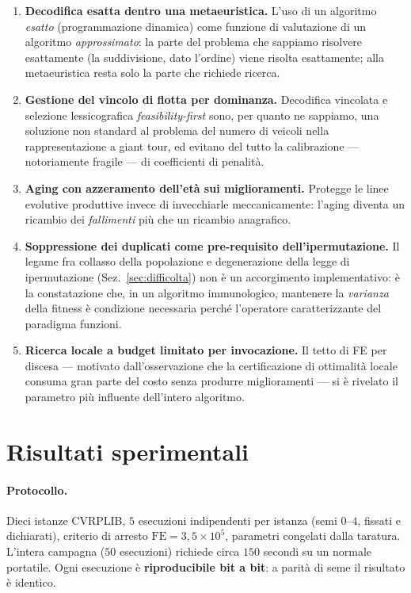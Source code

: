 \documentclass[10pt,a4paper]{article}
\begin{document}
\begin{enumerate}\itemsep1pt
  \item \textbf{Decodifica esatta dentro una metaeuristica.} L'uso di un algoritmo
  \emph{esatto} (programmazione dinamica) come funzione di valutazione di un
  algoritmo \emph{approssimato}: la parte del problema che sappiamo risolvere
  esattamente (la suddivisione, dato l'ordine) viene risolta esattamente; alla
  metaeuristica resta solo la parte che richiede ricerca.

  \item \textbf{Gestione del vincolo di flotta per dominanza.} Decodifica vincolata
  e selezione lessicografica \emph{feasibility-first} sono, per quanto ne sappiamo,
  una soluzione non standard al problema del numero di veicoli nella
  rappresentazione a giant tour, ed evitano del tutto la calibrazione --- notoriamente
  fragile --- di coefficienti di penalità.

  \item \textbf{Aging con azzeramento dell'età sui miglioramenti.} Protegge le linee
  evolutive produttive invece di invecchiarle meccanicamente: l'aging diventa un
  ricambio dei \emph{fallimenti} più che un ricambio anagrafico.

  \item \textbf{Soppressione dei duplicati come pre-requisito dell'ipermutazione.}
  Il legame fra collasso della popolazione e degenerazione della legge di
  ipermutazione (Sez.~\ref{sec:difficolta}) non è un accorgimento implementativo:
  è la constatazione che, in un algoritmo immunologico, mantenere la \emph{varianza}
  della fitness è condizione necessaria perché l'operatore caratterizzante del
  paradigma funzioni.

  \item \textbf{Ricerca locale a budget limitato per invocazione.} Il tetto di FE
  per discesa --- motivato dall'osservazione che la certificazione di ottimalità
  locale consuma gran parte del costo senza produrre miglioramenti --- si è rivelato
  il parametro più influente dell'intero algoritmo.
\end{enumerate}

\section{Risultati sperimentali}
\label{sec:risultati}

\paragraph{Protocollo.} Dieci istanze CVRPLIB, $5$ esecuzioni indipendenti per
istanza (semi $0$--$4$, fissati e dichiarati), criterio di arresto
$\mathrm{FE}=3{,}5\times10^5$, parametri congelati dalla taratura. L'intera
campagna ($50$ esecuzioni) richiede circa $150$ secondi su un normale portatile.
Ogni esecuzione è \textbf{riproducibile bit a bit}: a parità di seme il risultato
è identico.
\end{document}
